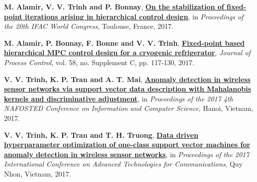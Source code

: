 \documentclass[a4paper,11pt]{article}
\begin{document}
	\vspace{0.2cm}

	\textbf{M. Alamir, V. V. Trinh and P. Bonnay}, \href{https://doi.org/10.1016/j.ifacol.2017.08.1363}{\textbf{On the stabilization of fixed-point iterations arising in hierarchical control design}}, in \emph{Proceedings of the 20th IFAC World Congress}, Toulouse, France, 2017. 
	
	\vspace{0.2cm}
	
	\textbf{M. Alamir, P. Bonnay, F. Bonne and V. V. Trinh}, \href{https://doi.org/10.1016/j.jprocont.2017.09.006}{\textbf{Fixed-point based hierarchical MPC control design for a cryogenic refrigerator}}, \emph{Journal of Process Control}, vol. 58, no. Supplement C, pp. 117-130, 2017. 
	
	\vspace{0.2cm}
	
	\textbf{V. V. Trinh, K. P. Tran and A. T. Mai}, \href{https://doi.org/10.1109/NAFOSTED.2017.8108030}{\textbf{Anomaly detection in wireless sensor networks via support vector data description with Mahalanobis kernels and discriminative adjustment}}, in \emph{Proceedings of the 2017 4th NAFOSTED Conference on Information and Computer Science}, Hanoi, Vietnam, 2017. 
	
	\vspace{0.2cm}
	
	\textbf{V. V. Trinh, K. P. Tran and T. H. Truong}, \href{https://doi.org/10.1109/ATC.2017.8167642}{\textbf{Data driven hyperparameter optimization of one-class support vector machines for anomaly detection in wireless sensor networks}}, in \emph{Proceedings of the 2017 International Conference on Advanced Technologies for Communications}, Quy Nhon, Vietnam, 2017. 
	
\end{document}
